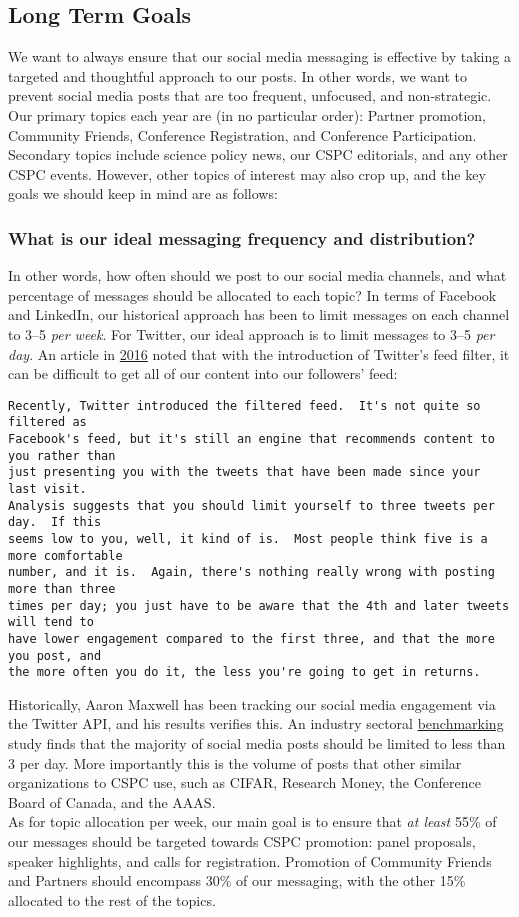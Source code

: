 \documentclass[11pt]{amsart}
\begin{document}
\subsection{Long Term Goals}
We want to always ensure that our social media messaging is effective by taking a targeted and thoughtful approach to our posts.
In other words, we want to prevent social media posts that are too frequent, unfocused, and non-strategic.
Our primary topics each year are (in no particular order): Partner promotion, Community Friends, Conference Registration, and Conference Participation.
Secondary topics include science policy news, our CSPC editorials, and any other CSPC events.
However, other topics of interest may also crop up, and the key goals we should keep in mind are as follows:
\subsubsection{What is our ideal messaging frequency and distribution?}
In other words, how often should we post to our social media channels, and what percentage of messages should be allocated to each topic?
In terms of Facebook and LinkedIn, our historical approach has been to limit messages on each channel to 3--5 \emph{per week}.
For Twitter, our ideal approach is to limit messages to 3--5 \emph{per day}.
An article in \href{http://follows.com/blog/2016/04/times-day-post-twitter}{2016} noted that with the introduction of Twitter's feed filter, it can be difficult to get all of our content into our followers' feed:
\begin{verbatim}
Recently, Twitter introduced the filtered feed.  It's not quite so filtered as
Facebook's feed, but it's still an engine that recommends content to you rather than
just presenting you with the tweets that have been made since your last visit.
Analysis suggests that you should limit yourself to three tweets per day.  If this
seems low to you, well, it kind of is.  Most people think five is a more comfortable
number, and it is.  Again, there's nothing really wrong with posting more than three
times per day; you just have to be aware that the 4th and later tweets will tend to
have lower engagement compared to the first three, and that the more you post, and
the more often you do it, the less you're going to get in returns.
\end{verbatim}
Historically, Aaron Maxwell has been tracking our social media engagement via the Twitter API, and his results verifies this.
An industry sectoral \href{https://blog.hubspot.com/marketing/social-media-frequency-industry-benchmarks}{benchmarking} study finds that the majority of social media posts should be limited to less than 3 per day.
More importantly this is the volume of posts that other similar organizations to CSPC use, such as CIFAR, Research Money, the Conference Board of Canada, and the AAAS.\\
\indent As for topic allocation per week, our main goal is to ensure that \emph{at least} 55\% of our messages should be targeted towards CSPC promotion: panel proposals, speaker highlights, and calls for registration.
Promotion of Community Friends and Partners should encompass 30\% of our messaging, with the other 15\% allocated to the rest of the topics.
\end{document}
